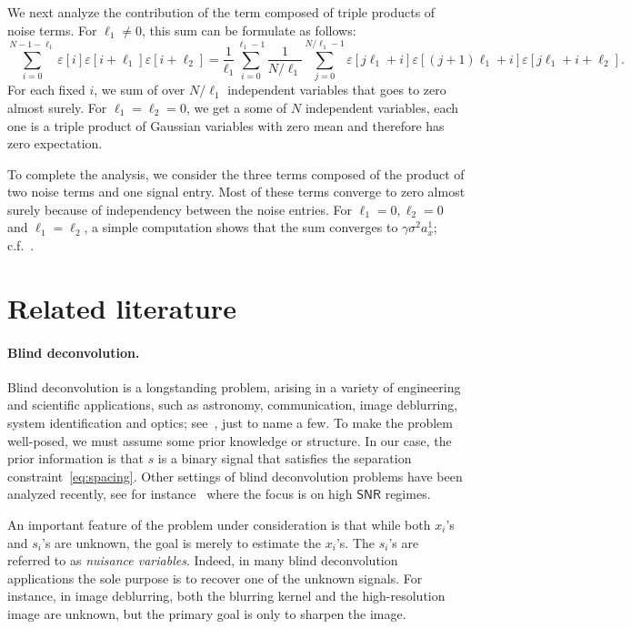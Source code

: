 \documentclass[english,11pt]{article}
\numberwithin{equation}{section}
\theoremstyle{plain}
\theoremstyle{definition}
\theoremstyle{remark}
\theoremstyle{plain}
\theoremstyle{remark}
\theoremstyle{plain}
\theoremstyle{plain}
\newcommand{\SNR}{{\textsf{SNR}}}
\begin{document}
We next analyze the contribution of the term composed of triple products of noise terms. For $\ell_1\neq 0$, this sum can be formulate as follows:
\begin{equation*}
\sum_{i=0}^{N-1-\ell_1} \varepsilon[i]\varepsilon[i+\ell_1]\varepsilon[i+\ell_2] = \frac{1}{\ell_1}\sum_{i=0}^{\ell_1-1}\frac{1}{N/\ell_1}\sum_{j=0}^{N/\ell_1 -1 }\varepsilon[j\ell_1+i]\varepsilon[(j+1)\ell_1+i]\varepsilon[j\ell_1+i+\ell_2].
\end{equation*}
For each fixed $i$, we sum of over $N/\ell_1$ independent variables that goes to zero almost surely. For $\ell_1=\ell_2=0$, we get a some of $N$ independent variables, each one is a triple product of Gaussian variables with zero mean and therefore has zero expectation. 

To complete the analysis, we consider the three terms composed of the product of two noise terms and one signal entry. Most of these terms converge to zero almost surely because of independency between the noise entries. For $\ell_1=0, \ell_2=0$ and $\ell_1=\ell_2$,  a simple computation shows that the sum converges to $\gamma\sigma^2a_x^1$; c.f.~\cite{boumal2017heterogeneous}.


\section{Related literature} \label{sec:related_literature}

\paragraph{Blind deconvolution.}
Blind deconvolution is a longstanding problem, arising in a variety of engineering and scientific applications, such as astronomy, communication, image deblurring, system identification and optics; see~\cite{jefferies1993restoration,shalvi1990new,ayers1988iterative,abed1997blind}, just to name a few. 
To make the problem well-posed, we must  assume some prior knowledge or  structure. 
In our case, the prior information is that $s$ is a binary signal that satisfies the separation constraint~\eqref{eq:spacing}. 
Other settings of blind deconvolution problems have been analyzed recently, see for instance~\cite{ahmed2014blind,li2016identifiability,li2016rapid,ling2015self,ling2017blind,chi2016guaranteed}
where the focus is on high $\SNR$ regimes.


An important feature of the problem under consideration is that while both $x_i$'s and $s_i$'s are unknown, the goal is merely to estimate the $x_i$'s. The  $s_i$'s  are referred to as \emph{nuisance  variables}. Indeed, in many blind deconvolution applications the sole purpose is to recover one of the unknown signals. For instance, in image deblurring, both the blurring
kernel and the high-resolution image are unknown, but the primary goal is only
to sharpen the image.
\end{document}

